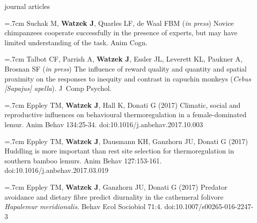 \documentclass[]{friggeri-cv}
\begin{document}




{\subfont\large{} journal articles}

\hangindent=.7cm Suchak M, \textbf{Watzek J}, Quarles LF, de Waal FBM (\emph{in press}) Novice chimpanzees cooperate successfully in the presence of experts, but may have limited understanding of the task. Anim Cogn.

\hangindent=.7cm Talbot CF, Parrish A, \textbf{Watzek J}, Essler JL, Leverett KL, Paukner A, Brosnan SF (\emph{in press}) The influence of reward quality and quantity and spatial proximity on the responses to inequity and contrast in capuchin monkeys (\emph{Cebus [Sapajus] apella}). J~Comp Psychol.

\hangindent=.7cm Eppley TM, \textbf{Watzek J}, Hall K, Donati G (2017) Climatic, social and reproductive influences on behavioural thermoregulation in a female-dominated lemur. Anim Behav 134:25-34. doi:10.1016/j.anbehav.2017.10.003

\hangindent=.7cm Eppley TM, \textbf{Watzek J}, Dausmann KH, Ganzhorn JU, Donati G (2017) Huddling is more important than rest site selection for thermoregulation in southern bamboo lemurs. Anim Behav 127:153-161. doi:10.1016/j.anbehav.2017.03.019

\hangindent=.7cm Eppley TM, \textbf{Watzek J}, Ganzhorn JU, Donati G (2017) Predator avoidance and dietary fibre predict diurnality in the cathemeral folivore \emph{Hapalemur meridionalis}. Behav Ecol Sociobiol 71:4. doi:10.1007/s00265-016-2247-3 \\[.5cm]

\end{document}
